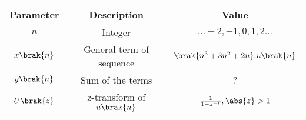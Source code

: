\begin{tabular}{|c|c|c|}
	\hline
	\textbf{Parameter} & \textbf{Description} & \textbf{Value}\\[6pt]
	\hline
	$n$ & Integer  & $... -2,-1,0,1,2 ...$\\[2pt]
	\hline
	$x \brak{n}$ & General term of sequence & $\brak{n^{3} + 3n^{2} + 2n}.u \brak{n}$\\[2pt]
	\hline
	$y \brak{n}$ & Sum of the terms & ?\\[2pt]
	\hline
	$U \brak{z}$ & z-transform of $u \brak{n}$ & $\frac{1}{1- z^{-1}} , \abs{z}> 1 $\\[2pt]
	\hline
\end{tabular}